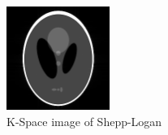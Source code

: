 \documentclass[paper=a4]{scrartcl}
\begin{document}
\begin{figure}[!ht]
    \centerline{\includegraphics[width=0.3\textwidth]{realspace.png}}
    \caption{K-Space image of Shepp-Logan}
    \label{fig:realspace}
\end{figure}
\end{document}
